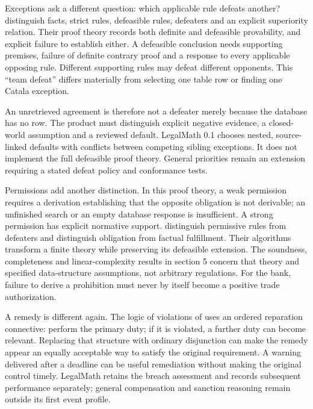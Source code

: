 
Exceptions ask a different question: which applicable rule defeats another?
\citet[sec.~2]{defeasible2000} distinguish facts, strict rules, defeasible rules,
defeaters and an explicit superiority relation. Their proof theory records both
definite and defeasible provability, and explicit failure to establish either.
A defeasible conclusion needs supporting premises, failure of definite contrary
proof and a response to every applicable opposing rule. Different supporting
rules may defeat different opponents. This ``team defeat'' differs materially
from selecting one table row or finding one Catala exception.

An unretrieved agreement is therefore not a defeater merely because the database
has no row. The product must distinguish explicit negative evidence, a
closed-world assumption and a reviewed default. LegalMath 0.1 chooses nested,
source-linked defaults with conflicts between competing sibling exceptions. It
does not implement the full defeasible proof theory. General priorities remain
an extension requiring a stated defeat policy and conformance tests.

Permissions add another distinction. In this proof theory, a weak permission
requires a derivation establishing that the opposite obligation is not
derivable; an unfinished search or an empty database response is insufficient.
A strong permission has explicit normative support. \citet[secs.~2--3, 6]{permissions2012} distinguish permissive
rules from defeaters and distinguish obligation from factual fulfillment.
Their algorithms transform a finite theory while preserving its defeasible
extension. The soundness, completeness and linear-complexity results in section 5
concern that theory and specified data-structure assumptions, not arbitrary
regulations. For the bank, failure to derive a prohibition must never by itself
become a positive trade authorization.

A remedy is different again. The logic of violations of
\citet[secs.~2--5]{violations2006} uses an ordered reparation connective: perform
the primary duty; if it is violated, a further duty can become relevant.
Replacing that structure with ordinary disjunction can make the remedy appear
an equally acceptable way to satisfy the original requirement. A warning delivered
after a deadline can be useful remediation without making the original control
timely. LegalMath retains the breach assessment and records subsequent performance
separately; general compensation and sanction reasoning remain outside its first
event profile.

